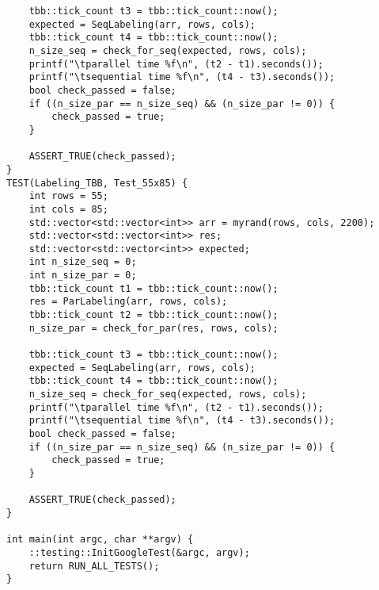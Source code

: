 \documentclass{report}
\begin{document}
\begin{lstlisting}
    tbb::tick_count t3 = tbb::tick_count::now();
    expected = SeqLabeling(arr, rows, cols);
    tbb::tick_count t4 = tbb::tick_count::now();
    n_size_seq = check_for_seq(expected, rows, cols);
    printf("\tparallel time %f\n", (t2 - t1).seconds());
    printf("\tsequential time %f\n", (t4 - t3).seconds());
    bool check_passed = false;
    if ((n_size_par == n_size_seq) && (n_size_par != 0)) {
        check_passed = true;
    }

    ASSERT_TRUE(check_passed);
}
TEST(Labeling_TBB, Test_55x85) {
    int rows = 55;
    int cols = 85;
    std::vector<std::vector<int>> arr = myrand(rows, cols, 2200);
    std::vector<std::vector<int>> res;
    std::vector<std::vector<int>> expected;
    int n_size_seq = 0;
    int n_size_par = 0;
    tbb::tick_count t1 = tbb::tick_count::now();
    res = ParLabeling(arr, rows, cols);
    tbb::tick_count t2 = tbb::tick_count::now();
    n_size_par = check_for_par(res, rows, cols);

    tbb::tick_count t3 = tbb::tick_count::now();
    expected = SeqLabeling(arr, rows, cols);
    tbb::tick_count t4 = tbb::tick_count::now();
    n_size_seq = check_for_seq(expected, rows, cols);
    printf("\tparallel time %f\n", (t2 - t1).seconds());
    printf("\tsequential time %f\n", (t4 - t3).seconds());
    bool check_passed = false;
    if ((n_size_par == n_size_seq) && (n_size_par != 0)) {
        check_passed = true;
    }

    ASSERT_TRUE(check_passed);
}

int main(int argc, char **argv) {
    ::testing::InitGoogleTest(&argc, argv);
    return RUN_ALL_TESTS();
}


\end{lstlisting}
\end{document}
